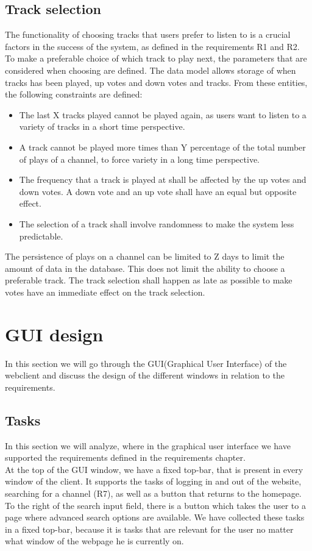 \documentclass[a4paper,11pt,report]{article}
\begin{document}
\subsection{Track selection}
The functionality of choosing tracks that users prefer to listen to is a crucial factors in the success of the system, as defined in the requirements R1 and R2. To make a preferable choice of which track to play next, the parameters that are considered when choosing are defined. The data model allows storage of when tracks has been played, up votes and down votes and tracks. From these entities, the following constraints are defined:
\begin{itemize}
\item The last X tracks played cannot be played again, as users want to listen to a variety of tracks in a short time perspective.
\item A track cannot be played more times than Y percentage of the total number of plays of a channel, to force variety in a long time perspective.
\item The frequency that a track is played at shall be affected by the up votes and down votes. A down vote and an up vote shall have an equal but opposite effect.
\item The selection of a track shall involve randomness to make the system less predictable.
\end{itemize}
The persistence of plays on a channel can be limited to Z days to limit the amount of data in the database. This does not limit the ability to choose a preferable track. The track selection shall happen as late as possible to make votes have an immediate effect on the track selection. 

\section{GUI design}
In this section we will go through the GUI(Graphical User Interface) of the webclient and discuss the design of the different windows in relation to the requirements.

\subsection{Tasks}
In this section we will analyze, where in the graphical user interface we have supported the requirements defined in the requirements chapter.\\

At the top of the GUI window, we have a fixed top-bar, that is present in every window of the client. It supports the tasks of logging in and out of the website, searching for a channel (R7), as well as a button that returns to the homepage. To the right of the search input field, there is a button which takes the user to a page where advanced search options are available. We have collected these tasks in a fixed top-bar, because it is tasks that are relevant for the user no matter what window of the webpage he is currently on.\\
\end{document}
